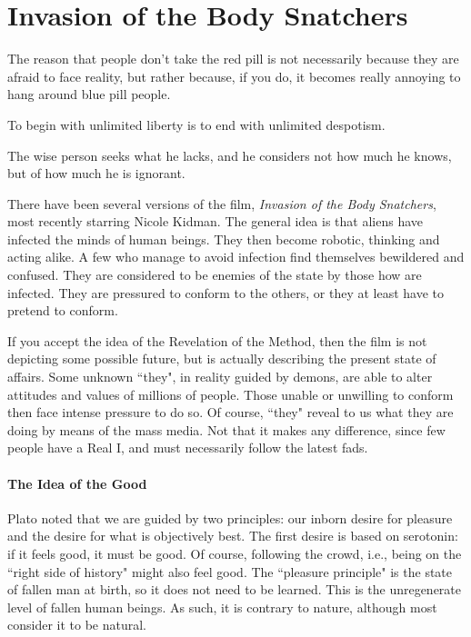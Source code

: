 \section{Invasion of the Body Snatchers}

\begin{quotex}
The reason that people don't take the red pill is not necessarily because they are afraid to face reality, but rather because, if you do, it becomes really annoying to hang around blue pill people. 

To begin with unlimited liberty is to end with unlimited despotism. 

The wise person seeks what he lacks, and he considers not how much he knows, but of how much he is ignorant. 

\end{quotex}
There have been several versions of the film, \emph{Invasion of the Body Snatchers}, most recently starring Nicole Kidman. The general idea is that aliens have infected the minds of human beings. They then become robotic, thinking and acting alike. A few who manage to avoid infection find themselves bewildered and confused. They are considered to be enemies of the state by those how are infected. They are pressured to conform to the others, or they at least have to pretend to conform.

If you accept the idea of the Revelation of the Method, then the film is not depicting some possible future, but is actually describing the present state of affairs. Some unknown ``they", in reality guided by demons, are able to alter attitudes and values of millions of people. Those unable or unwilling to conform then face intense pressure to do so. Of course, ``they" reveal to us what they are doing by means of the mass media. Not that it makes any difference, since few people have a Real I, and must necessarily follow the latest fads.

\paragraph{The Idea of the Good}
Plato noted that we are guided by two principles: our inborn desire for pleasure and the desire for what is objectively best. The first desire is based on serotonin: if it feels good, it must be good. Of course, following the crowd, i.e., being on the ``right side of history" might also feel good. The ``pleasure principle" is the state of fallen man at birth, so it does not need to be learned. This is the unregenerate level of fallen human beings. As such, it is contrary to nature, although most consider it to be natural.

